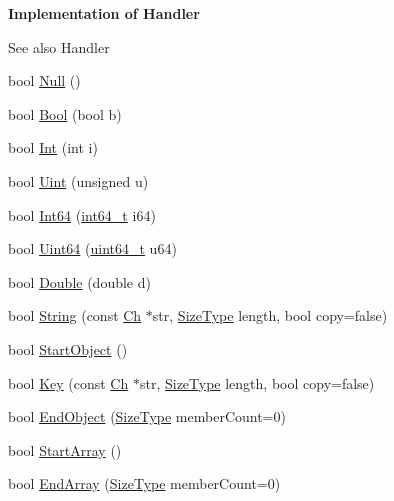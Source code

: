 \begin{Indent}{\bf Implementation of Handler}\par
{\em \begin{DoxySeeAlso}{See also}
Handler 
\end{DoxySeeAlso}
}\begin{DoxyCompactItemize}
\item 
bool \hyperlink{classPrettyWriter_acbcab646050e5e9204ab2b13c798092b}{Null} ()
\item 
bool \hyperlink{classPrettyWriter_afddf1586eeba72bc4fbb0e1346ced9b9}{Bool} (bool b)
\item 
bool \hyperlink{classPrettyWriter_a14da2a84e9f41ba42edf2819363be614}{Int} (int i)
\item 
bool \hyperlink{classPrettyWriter_a65227d9de9a9f92eb3ca83c616a9c809}{Uint} (unsigned u)
\item 
bool \hyperlink{classPrettyWriter_a2ce0d71e221d72b8cf17d2b60ae610af}{Int64} (\hyperlink{stdint_8h_a414156feea104f8f75b4ed9e3121b2f6}{int64\+\_\+t} i64)
\item 
bool \hyperlink{classPrettyWriter_a888229dc2e5a15b2fd577b47e86a17b3}{Uint64} (\hyperlink{stdint_8h_aec6fcb673ff035718c238c8c9d544c47}{uint64\+\_\+t} u64)
\item 
bool \hyperlink{classPrettyWriter_a20ffcf3ada1be664719f44cec76711ed}{Double} (double d)
\item 
bool \hyperlink{classPrettyWriter_ae6cec4b69e86cff3121451f29e4862ef}{String} (const \hyperlink{classPrettyWriter_ae5f474c0f087932d795c1cb4b9d0c312}{Ch} $\ast$str, \hyperlink{rapidjson_8h_a5ed6e6e67250fadbd041127e6386dcb5}{Size\+Type} length, bool copy=false)
\item 
bool \hyperlink{classPrettyWriter_a445e063722149f86bf1a0cd7b8892f07}{Start\+Object} ()
\item 
bool \hyperlink{classPrettyWriter_a26932858cdca972598f7caa6f415f310}{Key} (const \hyperlink{classPrettyWriter_ae5f474c0f087932d795c1cb4b9d0c312}{Ch} $\ast$str, \hyperlink{rapidjson_8h_a5ed6e6e67250fadbd041127e6386dcb5}{Size\+Type} length, bool copy=false)
\item 
bool \hyperlink{classPrettyWriter_a5837a63cac4735eaeedbaff287e1ab9e}{End\+Object} (\hyperlink{rapidjson_8h_a5ed6e6e67250fadbd041127e6386dcb5}{Size\+Type} member\+Count=0)
\item 
bool \hyperlink{classPrettyWriter_a12dd02678ab52b9061bb6ac01cca2601}{Start\+Array} ()
\item 
bool \hyperlink{classPrettyWriter_a5196275e826a37a163d178da612f58f9}{End\+Array} (\hyperlink{rapidjson_8h_a5ed6e6e67250fadbd041127e6386dcb5}{Size\+Type} member\+Count=0)
\end{DoxyCompactItemize}
\end{Indent}
